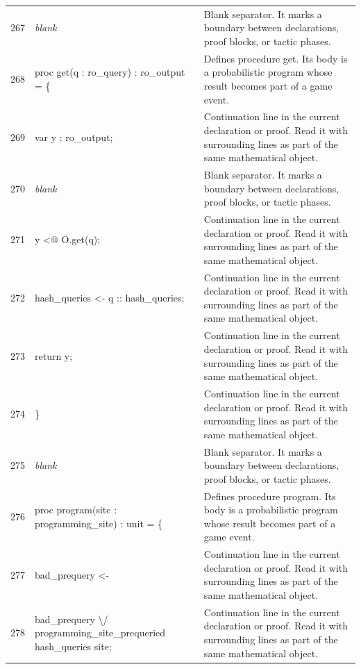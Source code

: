 \documentclass[10pt]{article}
\begin{document}
\begin{longtable}{r L{0.53\textwidth} L{0.37\textwidth}}
267 & {\ttfamily\scriptsize \emph{blank}} & Blank separator.  It marks a boundary between declarations, proof blocks, or tactic phases. \\
268 & {\ttfamily\scriptsize   proc get(q : ro\_query) : ro\_output = \{} & Defines procedure get.  Its body is a probabilistic program whose result becomes part of a game event. \\
269 & {\ttfamily\scriptsize     var y : ro\_output;} & Continuation line in the current declaration or proof.  Read it with surrounding lines as part of the same mathematical object. \\
270 & {\ttfamily\scriptsize \emph{blank}} & Blank separator.  It marks a boundary between declarations, proof blocks, or tactic phases. \\
271 & {\ttfamily\scriptsize     y <@ O.get(q);} & Continuation line in the current declaration or proof.  Read it with surrounding lines as part of the same mathematical object. \\
272 & {\ttfamily\scriptsize     hash\_queries <- q :: hash\_queries;} & Continuation line in the current declaration or proof.  Read it with surrounding lines as part of the same mathematical object. \\
273 & {\ttfamily\scriptsize     return y;} & Continuation line in the current declaration or proof.  Read it with surrounding lines as part of the same mathematical object. \\
274 & {\ttfamily\scriptsize   \}} & Continuation line in the current declaration or proof.  Read it with surrounding lines as part of the same mathematical object. \\
275 & {\ttfamily\scriptsize \emph{blank}} & Blank separator.  It marks a boundary between declarations, proof blocks, or tactic phases. \\
276 & {\ttfamily\scriptsize   proc program(site : programming\_site) : unit = \{} & Defines procedure program.  Its body is a probabilistic program whose result becomes part of a game event. \\
277 & {\ttfamily\scriptsize     bad\_prequery <-} & Continuation line in the current declaration or proof.  Read it with surrounding lines as part of the same mathematical object. \\
278 & {\ttfamily\scriptsize       bad\_prequery \textbackslash{}/ programming\_site\_prequeried hash\_queries site;} & Continuation line in the current declaration or proof.  Read it with surrounding lines as part of the same mathematical object. \\

\end{longtable}
\end{document}
